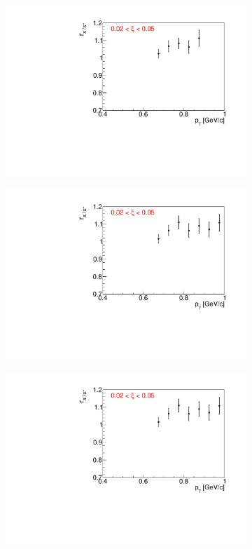 \begin{figure}[h!]
\begin{subfigure}{.32\textwidth}
		\includegraphics[width=\linewidth, page=11]{chapters/chrgSTAR/img/dEdx/fit2019_fitResult_2_0_step_0.pdf}%
	\end{subfigure}
	\begin{subfigure}{.32\textwidth}
		\includegraphics[width=\linewidth, page=12]{chapters/chrgSTAR/img/dEdx/fit2019_fitResult_2_0_step_1.pdf}
	\end{subfigure}
		\begin{subfigure}{.32\textwidth}
			\includegraphics[width=\linewidth, page=15]{chapters/chrgSTAR/img/dEdx/fit2019_fitResult_2_0_step_1.pdf}

\end{subfigure}
\end{figure}
